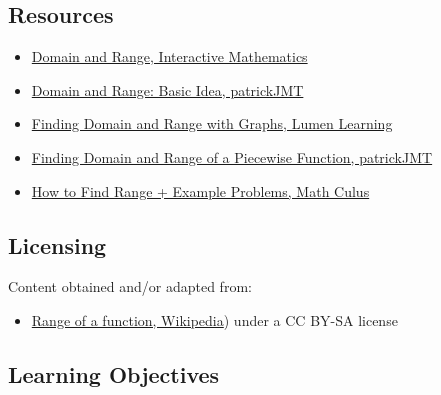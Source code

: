 \subsection{Resources}
\label{sss:reso-55b5}

\begin{itemize}
    \item \href{https://www.intmath.com/functions-and-graphs/2a-domain-and-range.php}{Domain and Range, Interactive Mathematics}
    \item \href{https://www.youtube.com/watch?v=Q3NWljhiSJg}{Domain and Range: Basic Idea, patrickJMT}
    \item \href{https://courses.lumenlearning.com/ivytech-collegealgebra/chapter/find-domain-and-range-from-graphs/}{Finding Domain and Range with Graphs, Lumen Learning}
    \item \href{https://www.youtube.com/watch?v=BxaYyS6lsQ4}{Finding Domain and Range of a Piecewise Function, patrickJMT}
    \item \href{https://mathculus.com/how-to-find-the-domain-and-range-of-a-function-algebraically/}{How to Find Range + Example Problems, Math Culus}
\end{itemize}

\subsection{Licensing}
\label{sss:lice-7352}

Content obtained and/or adapted from:

\begin{itemize}
    \item \href{https://en.wikipedia.org/wiki/Range_(mathematics}{Range of a function, Wikipedia}) under a CC BY-SA license
\end{itemize}

\subsection{Learning Objectives}
\label{ssec:lear-0b2d}

